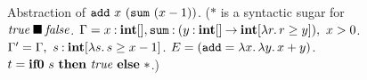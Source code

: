 \begin{figure}[t]

\caption{Abstraction of ${{\mathtt{add}}~{x}}~{({\mathtt{sum}}~{(x-1)})}$.
 ($*$ is a syntactic sugar for ${\mathit{true}}\mathbin{\blacksquare}{\mathit{false}}$.
  $\Gamma = x\mathbin{:}\mathbf{int}[], \mathtt{sum}\mathbin{:}({y\mathbin{:}\mathbf{int}[]}\mathbin{\rightarrow}{\mathbf{int}[\lambda{r}.\,{r \geq y}]}),~ x>0$.
  $\Gamma' = \Gamma,~s\mathbin{:}\mathbf{int}[\lambda{s}.\,{s \geq x-1}]$.
  $E = (\mathtt{add}=\lambda{x}.\,{\lambda{y}.\,{x+y}})$.
  $t = \mathbf{if0}~{s}~\mathbf{then}~{\mathit{true}}~\mathbf{else}~{*}$.)}
\label{fig:abst-example}
\end{figure}
%

